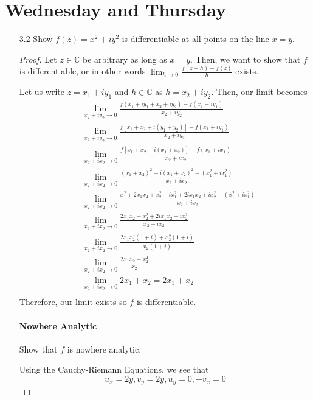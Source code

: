 \documentclass[11pt]{article}
\begin{document}
\section{Wednesday and Thursday}
\begin{enumerate}
	\item[3.2] Show $f(z) = x^2 + iy^2$ is differentiable at all points on the line $x = y$. 
	\begin{proof}
		Let $z \in \mathbb{C}$ be arbitrary as long as $x = y$. Then, we want to show that $f$ is differentiable, or in other words $\lim_{h \rightarrow 0} \frac{f(z+h) - f(z)}{h}$ exists.
		
		Let us write $z = x_1 + iy_1$ and $h \in \mathbb{C}$ as $h = x_2 + iy_2$. Then, our limit becomes
		\[\begin{aligned}
		& \lim_{x_2 + iy_2 \rightarrow 0} \frac{
			f(x_1 + iy_1 + x_2 + iy_2) -
			f(x_1 + iy_1)}{
			x_2 + iy_2} \\
		& \lim_{x_2 + iy_2 \rightarrow 0} \frac{
			f[x_1 + x_2 + i(y_1 + y_2)] -
			f(x_1 + iy_1)}{
			x_2 + iy_2} \\
		& \lim_{x_2 + ix_2 \rightarrow 0} \frac{
			f[x_1 + x_2 + i(x_1 + x_2)] -
			f(x_1 + ix_1)}{
			x_2 + ix_2} \\
		& \lim_{x_2 + ix_2 \rightarrow 0} \frac{
			(x_1 + x_2)^2 + i(x_1 + x_2)^2 -
			(x_1^2 + ix_1^2)}{
			x_2 + ix_2} \\
		& \lim_{x_2 + ix_2 \rightarrow 0} \frac{
			x_1^2 + 2x_1x_2 + x_2^2 + ix_1^2 + 2ix_1x_2 + ix_2^2 -
			(x_1^2 + ix_1^2)}{
			x_2 + ix_2} \\
		& \lim_{x_2 + ix_2 \rightarrow 0} \frac{
			2x_1x_2 + x_2^2 + 2ix_1x_2 + ix_2^2}{
			x_2 + ix_2} \\
		& \lim_{x_2 + ix_2 \rightarrow 0} \frac{
			2x_1x_2(1 + i) + x_2^2(1 + i)}{
			x_2(1 + i)} \\
		& \lim_{x_2 + ix_2 \rightarrow 0} \frac{
			2x_1x_2 + x_2^2}{
			x_2} \\
		& \lim_{x_2 + ix_2 \rightarrow 0} 2x_1 + x_2 = 2x_1 + x_2 \\
		\end{aligned}\]
		Therefore, our limit exists so $f$ is differentiable.
		
		\paragraph{Nowhere Analytic} Show that $f$ is nowhere analytic.
		
		Using the Cauchy-Riemann Equations, we see that 
		\[u_x = 2y, v_y = 2y, u_y =0, -v_x = 0\]
		

\end{proof}
\end{enumerate}
\end{document}
